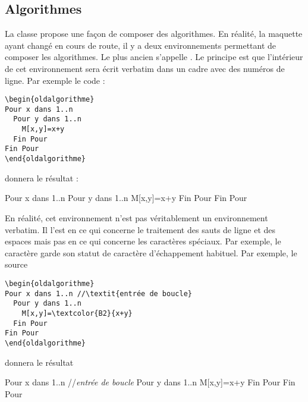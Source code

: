 \documentclass[nocrop]{sesamanuel}
\begin{document}
\subsection{Algorithmes}
La classe propose une façon de composer des algorithmes. En réalité,
la maquette ayant changé en cours de route, il y a deux
environnements permettant de composer les algorithmes. Le plus ancien
s'appelle . Le principe est que l'intérieur de
cet environnement sera écrit verbatim dans un cadre avec des numéros
de ligne. Par exemple le code :
\begin{verbatim}
\begin{oldalgorithme}
Pour x dans 1..n
  Pour y dans 1..n
    M[x,y]=x+y
  Fin Pour
Fin Pour
\end{oldalgorithme}
\end{verbatim}
donnera le résultat :
\begin{oldalgorithme}
Pour x dans 1..n
  Pour y dans 1..n
    M[x,y]=x+y
  Fin Pour
Fin Pour
\end{oldalgorithme}
En réalité, cet environnement n'est pas véritablement un environnement
verbatim. Il l'est en ce qui concerne le traitement des sauts de
ligne et des espaces mais pas en ce qui concerne les caractères
spéciaux. Par exemple, le caractère \cmd{} garde son statut de
caractère d'échappement habituel. Par exemple, le source
\begin{verbatim}
\begin{oldalgorithme}
Pour x dans 1..n //\textit{entrée de boucle}
  Pour y dans 1..n
    M[x,y]=\textcolor{B2}{x+y}
  Fin Pour
Fin Pour
\end{oldalgorithme}
\end{verbatim}
donnera le résultat
\begin{oldalgorithme}
Pour x dans 1..n //\textit{entrée de boucle}
  Pour y dans 1..n
    M[x,y]=\textcolor{B2}{x+y}
  Fin Pour
Fin Pour
\end{oldalgorithme}
\end{document}
